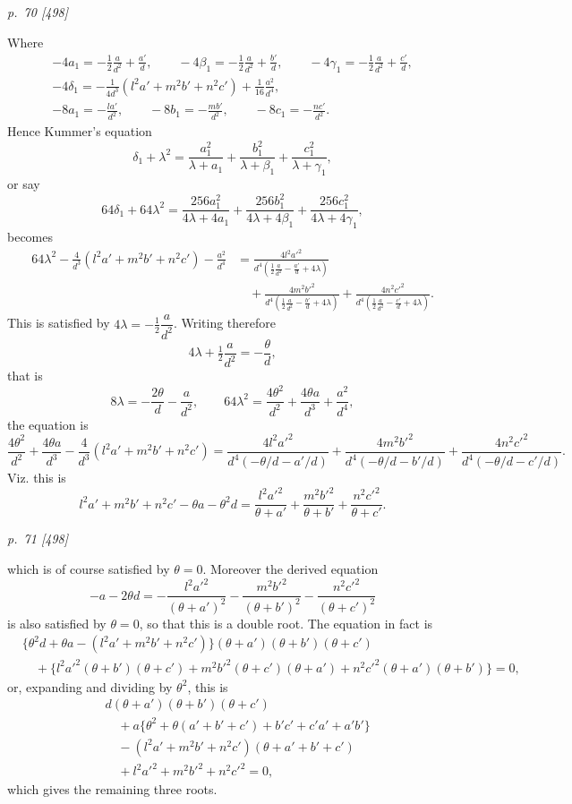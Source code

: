 \documentclass[11pt,a4paper]{article}
\newcommand{\pagemarker}[2]{\clearpage\noindent\textit{p.~#1 [#2]}\par\medskip}
\newcommand{\half}{\tfrac{1}{2}}
\begin{document}
\pagemarker{70}{498}
Where
\[
\begin{gathered}
-4a_1=-\half\frac{a}{d^2}+\frac{a'}d,\qquad
-4\beta_1=-\half\frac{a}{d^2}+\frac{b'}d,\qquad
-4\gamma_1=-\half\frac{a}{d^2}+\frac{c'}d,\\
-4\delta_1=-\frac1{4d^3}(l^2a'+m^2b'+n^2c')+\frac1{16}\frac{a^2}{d^4},\\
-8a_1=-\frac{la'}{d^2},\qquad
-8b_1=-\frac{mb'}{d^2},\qquad
-8c_1=-\frac{nc'}{d^2}.
\end{gathered}
\]
Hence Kummer's equation
\[
  \delta_1+\lambda^2
  =\frac{a_1^2}{\lambda+a_1}
  +\frac{b_1^2}{\lambda+\beta_1}
  +\frac{c_1^2}{\lambda+\gamma_1},
\]
or say
\[
  64\delta_1+64\lambda^2
  =\frac{256a_1^2}{4\lambda+4a_1}
  +\frac{256b_1^2}{4\lambda+4\beta_1}
  +\frac{256c_1^2}{4\lambda+4\gamma_1},
\]
becomes
\[
\begin{aligned}
64\lambda^2-\frac4{d^3}(l^2a'+m^2b'+n^2c')-\frac{a^2}{d^4}
&=\frac{4l^2a'^2}{d^4(\half\frac{a}{d^2}-\frac{a'}d+4\lambda)}\\
&\quad+\frac{4m^2b'^2}{d^4(\half\frac{a}{d^2}-\frac{b'}d+4\lambda)}
+\frac{4n^2c'^2}{d^4(\half\frac{a}{d^2}-\frac{c'}d+4\lambda)}.
\end{aligned}
\]
This is satisfied by \(4\lambda=-\half\dfrac{a}{d^2}\). Writing therefore
\[
  4\lambda+\half\frac{a}{d^2}=-\frac{\theta}{d},
\]
that is
\[
  8\lambda=-\frac{2\theta}{d}-\frac{a}{d^2},\qquad
  64\lambda^2=\frac{4\theta^2}{d^2}+\frac{4\theta a}{d^3}+\frac{a^2}{d^4},
\]
the equation is
\[
  \frac{4\theta^2}{d^2}+\frac{4\theta a}{d^3}
  -\frac4{d^3}(l^2a'+m^2b'+n^2c')
  =
  \frac{4l^2a'^2}{d^4(-\theta/d-a'/d)}
  +\frac{4m^2b'^2}{d^4(-\theta/d-b'/d)}
  +\frac{4n^2c'^2}{d^4(-\theta/d-c'/d)}.
\]
Viz. this is
\[
  l^2a'+m^2b'+n^2c'-\theta a-\theta^2d
  =
  \frac{l^2a'^2}{\theta+a'}
  +\frac{m^2b'^2}{\theta+b'}
  +\frac{n^2c'^2}{\theta+c'}.
\]

\pagemarker{71}{498}
which is of course satisfied by \(\theta=0\). Moreover the derived equation
\[
  -a-2\theta d
  =-\frac{l^2a'^2}{(\theta+a')^2}
   -\frac{m^2b'^2}{(\theta+b')^2}
   -\frac{n^2c'^2}{(\theta+c')^2}
\]
is also satisfied by \(\theta=0\), so that this is a double root. The equation in fact is
\[
\begin{aligned}
&\{\theta^2d+\theta a-(l^2a'+m^2b'+n^2c')\}
(\theta+a')(\theta+b')(\theta+c')\\
&\quad+\{l^2a'^2(\theta+b')(\theta+c')
+m^2b'^2(\theta+c')(\theta+a')
+n^2c'^2(\theta+a')(\theta+b')\}=0,
\end{aligned}
\]
or, expanding and dividing by \(\theta^2\), this is
\[
\begin{aligned}
&d(\theta+a')(\theta+b')(\theta+c')\\
&\quad+a\{\theta^2+\theta(a'+b'+c')+b'c'+c'a'+a'b'\}\\
&\quad-(l^2a'+m^2b'+n^2c')(\theta+a'+b'+c')\\
&\quad+l^2a'^2+m^2b'^2+n^2c'^2=0,
\end{aligned}
\]
which gives the remaining three roots.
\end{document}
